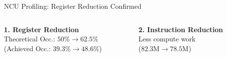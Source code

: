 \documentclass[aspectratio=169, table]{beamer}
\begin{document}
\begin{frame}{NCU Profiling: Register Reduction Confirmed}

    \begin{tcolorbox}[
        title=Dual Optimization Mechanism,
        colback=white,
        colframe=acadblue,
        left=3mm, right=3mm, top=2mm, bottom=2mm,
        boxsep=1pt,
        arc=2mm,
        boxrule=0.8pt,
        fonttitle=\bfseries\small
    ]
        \begin{columns}[T]
            \begin{column}{0.55\textwidth}
                \centering
                \textbf{\footnotesize 1. Register Reduction} \\
                \vspace{0.3em}
                \scriptsize Theoretical Occ.: $50\% \to \mathbf{62.5\%}$ \\
                \tiny (Achieved Occ.: $39.3\% \to 48.6\%$)
            \end{column}

            \begin{column}{0.45\textwidth}
                \centering
                \textbf{\footnotesize 2. Instruction Reduction} \\
                \vspace{0.3em}
                \scriptsize \vphantom{Theoretical Occ.:} Less compute work \\
                \tiny ($82.3\text{M} \to 78.5\text{M}$)
            \end{column}
        \end{columns}
    \end{tcolorbox}
\end{frame}
\end{document}
